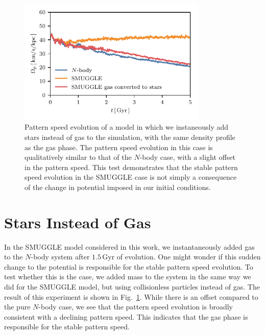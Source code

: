 \begin{appendices}
\begin{figure}
    \centering
    \includegraphics[width=9cm]{ch2/fig/ps_star.pdf}
    \caption{Pattern speed evolution of a model in which we instaneously
    add stars instead of gas to the simulation, with the same density profile as
    the gas phase. The pattern speed evolution in this case is qualitatively
    similar to that of the $N$-body case, with a slight offset in the pattern
    speed. This test demonstrates that the stable pattern speed evolution in the
    SMUGGLE case is not simply a consequence of the change in potential imposed
    in our initial conditions.}
\label{fig:ps-star}
\end{figure}

\section{Stars Instead of Gas}
In the SMUGGLE model considered in this work, we instantaneously added gas to
the $N$-body system after $1.5\,\textrm{Gyr}$ of evolution. One might wonder if
this sudden change to the potential is responsible for the stable pattern speed
evolution. To test whether this is the case, we added mass to the system in the
same way we did for the SMUGGLE model, but using collisionless particles instead
of gas. The result of this experiment is shown in Fig.~\ref{fig:ps-star}. While
there is an offset compared to the pure $N$-body case, we see that the pattern
speed evolution is broadly consistent with a declining pattern speed. This
indicates that the gas phase is responsible for the stable pattern speed.


\end{appendices}
